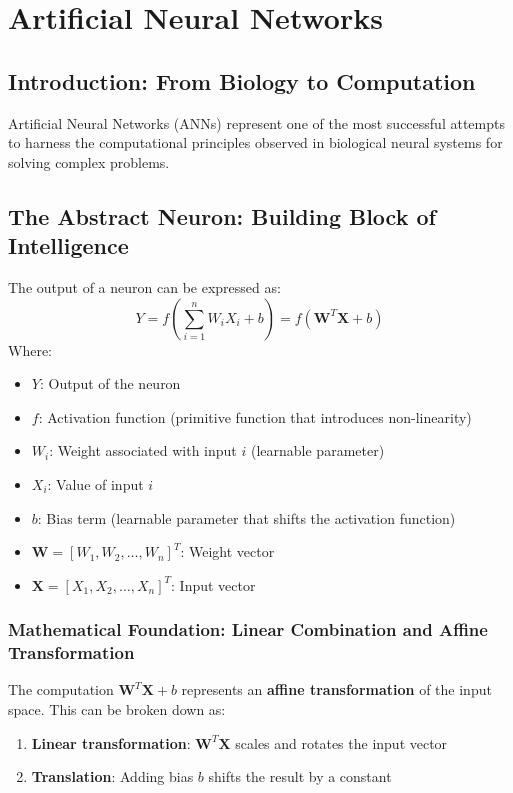 \section{Artificial Neural Networks}
\subsection{Introduction: From Biology to Computation}
Artificial Neural Networks (ANNs) represent one of the most successful attempts to harness the computational principles observed in biological neural systems for solving complex problems.

\subsection{The Abstract Neuron: Building Block of Intelligence}
The output of a neuron can be expressed as:
\[ Y = f\left(\sum_{i=1}^{n} W_i X_i + b\right) = f(\mathbf{W}^T \mathbf{X} + b)\]
Where:
\begin{itemize}
    \item \(Y\): Output of the neuron
    \item \(f\): Activation function (primitive function that introduces non-linearity)
    \item \(W_i\): Weight associated with input \(i\) (learnable parameter)
    \item \(X_i\): Value of input \(i\)
    \item \(b\): Bias term (learnable parameter that shifts the activation function)
    \item \(\mathbf{W} = [W_1, W_2, \ldots, W_n]^T\): Weight vector
    \item \(\mathbf{X} = [X_1, X_2, \ldots, X_n]^T\): Input vector
\end{itemize}

\subsubsection{Mathematical Foundation: Linear Combination and Affine Transformation}
The computation \(\mathbf{W}^T \mathbf{X} + b\) represents an \textbf{affine transformation} of the input space. This can be broken down as:
\begin{enumerate}
    \item \textbf{Linear transformation}: \(\mathbf{W}^T \mathbf{X}\) scales and rotates the input vector
    \item \textbf{Translation}: Adding bias \(b\) shifts the result by a constant
\end{enumerate}


